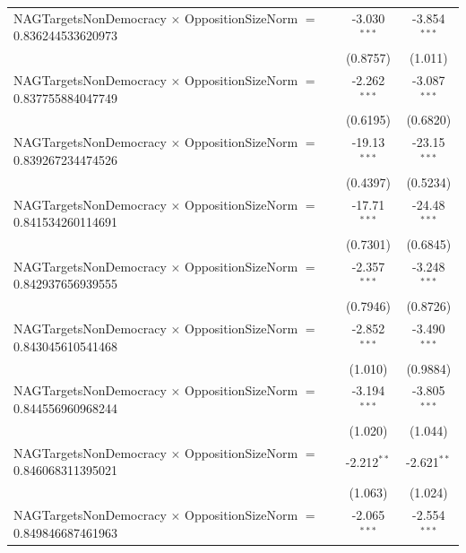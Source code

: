 \begin{tabular}{lcc}
   NAGTargetsNonDemocracy $\times$ OppositionSizeNorm $=$ 0.836244533620973     & -3.030$^{***}$       & -3.854$^{***}$\\   
                                                                                & (0.8757)             & (1.011)\\   
   NAGTargetsNonDemocracy $\times$ OppositionSizeNorm $=$ 0.837755884047749     & -2.262$^{***}$       & -3.087$^{***}$\\   
                                                                                & (0.6195)             & (0.6820)\\   
   NAGTargetsNonDemocracy $\times$ OppositionSizeNorm $=$ 0.839267234474526     & -19.13$^{***}$       & -23.15$^{***}$\\   
                                                                                & (0.4397)             & (0.5234)\\   
   NAGTargetsNonDemocracy $\times$ OppositionSizeNorm $=$ 0.841534260114691     & -17.71$^{***}$       & -24.48$^{***}$\\   
                                                                                & (0.7301)             & (0.6845)\\   
   NAGTargetsNonDemocracy $\times$ OppositionSizeNorm $=$ 0.842937656939555     & -2.357$^{***}$       & -3.248$^{***}$\\   
                                                                                & (0.7946)             & (0.8726)\\   
   NAGTargetsNonDemocracy $\times$ OppositionSizeNorm $=$ 0.843045610541468     & -2.852$^{***}$       & -3.490$^{***}$\\   
                                                                                & (1.010)              & (0.9884)\\   
   NAGTargetsNonDemocracy $\times$ OppositionSizeNorm $=$ 0.844556960968244     & -3.194$^{***}$       & -3.805$^{***}$\\   
                                                                                & (1.020)              & (1.044)\\   
   NAGTargetsNonDemocracy $\times$ OppositionSizeNorm $=$ 0.846068311395021     & -2.212$^{**}$        & -2.621$^{**}$\\   
                                                                                & (1.063)              & (1.024)\\   
   NAGTargetsNonDemocracy $\times$ OppositionSizeNorm $=$ 0.849846687461963     & -2.065$^{***}$       & -2.554$^{***}$\\   

\end{tabular}
